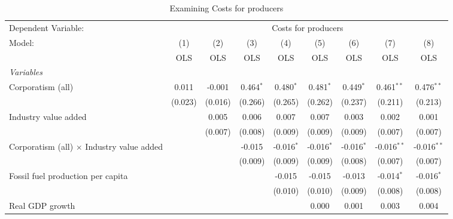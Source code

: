 
\begin{table}[htbp]
   \caption{Examining Costs for producers}
   \centering
   \begin{tabular}{lcccccccc}
      \toprule
      Dependent Variable: & \multicolumn{8}{c}{Costs for producers}\\
      Model:                                           & (1)     & (2)     & (3)         & (4)          & (5)          & (6)          & (7)           & (8)\\  
                                                       &  OLS    & OLS     & OLS         & OLS          & OLS          & OLS          & OLS           & OLS\\  
      \midrule
      \emph{Variables}\\
      Corporatism (all)                                & 0.011   & -0.001  & 0.464$^{*}$ & 0.480$^{*}$  & 0.481$^{*}$  & 0.449$^{*}$  & 0.461$^{**}$  & 0.476$^{**}$\\   
                                                       & (0.023) & (0.016) & (0.266)     & (0.265)      & (0.262)      & (0.237)      & (0.211)       & (0.213)\\   
      Industry value added                             &         & 0.005   & 0.006       & 0.007        & 0.007        & 0.003        & 0.002         & 0.001\\   
                                                       &         & (0.007) & (0.008)     & (0.009)      & (0.009)      & (0.009)      & (0.007)       & (0.007)\\   
      Corporatism (all) $\times$ Industry value added  &         &         & -0.015      & -0.016$^{*}$ & -0.016$^{*}$ & -0.016$^{*}$ & -0.016$^{**}$ & -0.016$^{**}$\\   
                                                       &         &         & (0.009)     & (0.009)      & (0.009)      & (0.008)      & (0.007)       & (0.007)\\   
      Fossil fuel production per capita                &         &         &             & -0.015       & -0.015       & -0.013       & -0.014$^{*}$  & -0.016$^{*}$\\   
                                                       &         &         &             & (0.010)      & (0.010)      & (0.009)      & (0.008)       & (0.008)\\   
      Real GDP growth                                  &         &         &             &              & 0.000        & 0.001        & 0.003         & 0.004\\   

\end{tabular}
\end{table}
